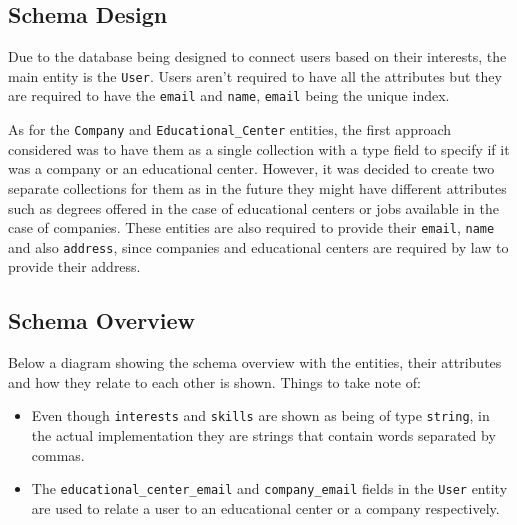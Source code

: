 \documentclass[english]{article}
\begin{document}
\subsection{Schema Design}

\par
Due to the database being designed to connect users based on their interests,
the main entity is the \texttt{User}. Users aren't required to have all the
attributes but they are required to have the \texttt{email} and \texttt{name},
\texttt{email} being the unique index.

\par
As for the \texttt{Company} and \texttt{Educational\_Center} entities,
the first approach considered was to have them as a single collection
with a type field to specify if it was a company or an educational center.
However, it was decided to create two separate collections for them as in
the future they might have different attributes such as degrees offered
in the case of educational centers or jobs available in the case of
companies. These entities are also required to provide their \texttt{email},
\texttt{name} and also \texttt{address}, since companies and educational
centers are required by law to provide their address.

\subsection{Schema Overview}

\par
Below a diagram showing the schema overview with the entities, their
attributes and how they relate to each other is shown. Things to take note of:

\begin{itemize}
	\item Even though \texttt{interests} and \texttt{skills} are shown as being
	      of type \texttt{string}, in the actual implementation they are strings
	      that contain words separated by commas.
	\item The \texttt{educational\_center\_email} and \texttt{company\_email}
	      fields in the \texttt{User} entity are used to relate a user to an
	      educational center or a company respectively.
\end{itemize}




\end{document}
